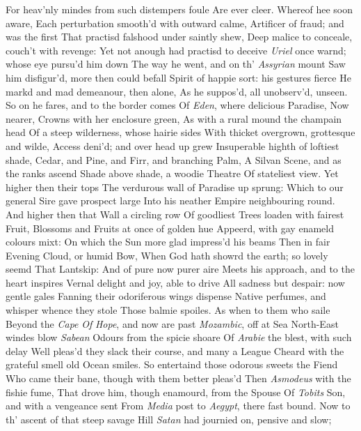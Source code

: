 \documentclass[11pt]{book}
\newcounter {first}
\begin{document}
For heav'nly mindes from such distempers foule 
Are ever cleer.  Whereof hee soon aware, 
Each perturbation smooth'd with outward calme, 
Artificer of fraud; and was the first 
That practisd falshood under saintly shew, 
Deep malice to conceale, couch't with revenge: 
Yet not anough had practisd to deceive 
\textit{Uriel} once warnd; whose eye pursu'd him down 
The way he went, and on th' \textit{Assyrian} mount 
Saw him disfigur'd, more then could befall 
Spirit of happie sort: his gestures fierce 
He markd and mad demeanour, then alone, 
As he suppos'd, all unobserv'd, unseen. 
So on he fares, and to the border comes 
Of \textit{Eden}, where delicious Paradise, 
Now nearer, Crowns with her enclosure green, 
As with a rural mound the champain head 
Of a steep wilderness, whose hairie sides 
With thicket overgrown, grottesque and wilde, 
Access deni'd; and over head up grew 
Insuperable highth of loftiest shade, 
Cedar, and Pine, and Firr, and branching Palm, 
A Silvan Scene, and as the ranks ascend 
Shade above shade, a woodie Theatre 
Of stateliest view.  Yet higher then their tops 
The verdurous wall of Paradise up sprung: 
Which to our general Sire gave prospect large 
Into his neather Empire neighbouring round. 
And higher then that Wall a circling row 
Of goodliest Trees loaden with fairest Fruit, 
Blossoms and Fruits at once of golden hue 
Appeerd, with gay enameld colours mixt: 
On which the Sun more glad impress'd his beams 
Then in fair Evening Cloud, or humid Bow, 
When God hath showrd the earth; so lovely seemd 
That Lantskip: And of pure now purer aire 
Meets his approach, and to the heart inspires 
Vernal delight and joy, able to drive 
All sadness but despair: now gentle gales 
Fanning their odoriferous wings dispense 
Native perfumes, and whisper whence they stole 
Those balmie spoiles.  As when to them who saile 
Beyond the \textit{Cape} \textit{Of} \textit{Hope}, and now are past 
\textit{Mozambic}, off at Sea North-East windes blow 
\textit{Sabean} Odours from the spicie shoare 
Of \textit{Arabie} the blest, with such delay 
Well pleas'd they slack their course, and many a League 
Cheard with the grateful smell old Ocean smiles. 
So entertaind those odorous sweets the Fiend 
Who came their bane, though with them better pleas'd 
Then \textit{Asmodeus} with the fishie fume, 
That drove him, though enamourd, from the Spouse 
Of \textit{Tobits} Son, and with a vengeance sent 
From \textit{Media} post to \textit{Aegypt}, there fast bound. 
\quad Now to th' ascent of that steep savage Hill 
\textit{Satan} had journied on, pensive and slow; 
\end{document}

